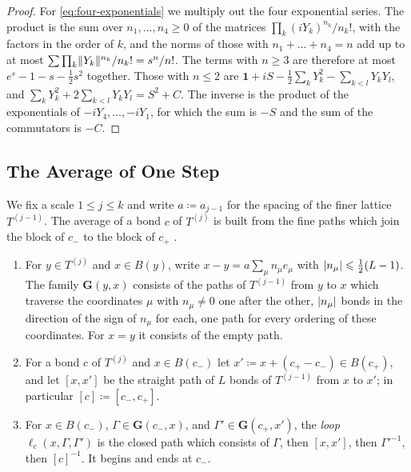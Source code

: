 \documentclass[11pt]{preprint}
\newcommand{\id}{\mathbf 1}
\DeclarePairedDelimiter{\abs}{\lvert}{\rvert}
\DeclarePairedDelimiter{\norm}{\lVert}{\rVert}
\numberwithin{equation}{section}
\begin{document}
\begin{proof}
For \eqref{eq:four-exponentials} we multiply out the four exponential series. The product is the sum over $n_1, \dots, n_4 \geqslant 0$ of the matrices $\prod_k(iY_k)^{n_k}/n_k!$, with the factors in the order of $k$, and the norms of those with $n_1 + \dots + n_4 = n$ add up to at most $\sum\prod_k\norm{Y_k}^{n_k}/n_k! = s^n/n!$. The terms with $n \geqslant 3$ are therefore at most $e^s - 1 - s - \frac{1}{2}s^2$ together. Those with $n \leqslant 2$ are $\id + iS - \frac{1}{2}\sum_kY_k^2 - \sum_{k<l}Y_kY_l$, and $\sum_kY_k^2 + 2\sum_{k<l}Y_kY_l = S^2 + C$. The inverse is the product of the exponentials of $-iY_4, \dots, -iY_1$, for which the sum is $-S$ and the sum of the commutators is $-C$.
\end{proof}

\subsection{The Average of One Step}\label{sec:average}

We fix a scale $1 \leqslant j \leqslant k$ and write $a \coloneqq a_{j-1}$ for the spacing of the finer lattice $T^{(j-1)}$. The average of a bond $c$ of $T^{(j)}$ is built from the fine paths which join the block of $c_-$ to the block of $c_+$ \cite[p.~252, (0.4), p.~253]{BalabanRG1}.

\begin{definition}\label{def:block-paths}
\begin{enumerate}[label=(\roman*)]
\item For $y \in T^{(j)}$ and $x \in B(y)$, write $x - y = a\sum_\mu n_\mu e_\mu$ with $\abs{n_\mu} \leqslant \frac{1}{2}(L - 1)$. The family $\mathbf G(y, x)$ consists of the paths of $T^{(j-1)}$ from $y$ to $x$ which traverse the coordinates $\mu$ with $n_\mu \neq 0$ one after the other, $\abs{n_\mu}$ bonds in the direction of the sign of $n_\mu$ for each, one path for every ordering of these coordinates. For $x = y$ it consists of the empty path.
\item For a bond $c$ of $T^{(j)}$ and $x \in B(c_-)$ let $x' \coloneqq x + (c_+ - c_-) \in B(c_+)$, and let $[x, x']$ be the straight path of $L$ bonds of $T^{(j-1)}$ from $x$ to $x'$; in particular $[c] \coloneqq [c_-, c_+]$.
\item For $x \in B(c_-)$, $\Gamma \in \mathbf G(c_-, x)$, and $\Gamma' \in \mathbf G(c_+, x')$, the \emph{loop} $\ell_c(x, \Gamma, \Gamma')$ is the closed path which consists of $\Gamma$, then $[x, x']$, then $\Gamma'^{-1}$, then $[c]^{-1}$. It begins and ends at $c_-$.
\end{enumerate}
\end{definition}
\end{document}
